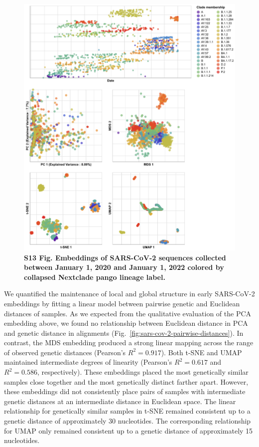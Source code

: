 \documentclass[10pt,letterpaper]{article}
\begin{document}
\begin{figure}[!h]
\includegraphics[width=\columnwidth]{figures/sarscov2-embeddings-by-Nextclade_pango_collapsed-clade.png}
\caption*{{\bf S13 Fig. Embeddings of SARS-CoV-2 sequences collected between January 1, 2020 and January 1, 2022 colored by collapsed Nextclade pango lineage label.}}
\end{figure}

We quantified the maintenance of local and global structure in early SARS-CoV-2 embeddings by fitting a linear model between pairwise genetic and Euclidean distances of samples.
As we expected from the qualitative evaluation of the PCA embedding above, we found no relationship between Euclidean distance in PCA and genetic distance in alignments (Fig.~\ref{fig:sars-cov-2-pairwise-distances}).
In contrast, the MDS embedding produced a strong linear mapping across the range of observed genetic distances (Pearson's $R^{2}=0.917$).
Both t-SNE and UMAP maintained intermediate degrees of linearity (Pearson's $R^{2}=0.617$ and $R^{2}=0.586$, respectively).
These embeddings placed the most genetically similar samples close together and the most genetically distinct farther apart.
However, these embeddings did not consistently place pairs of samples with intermediate genetic distances at an intermediate distance in Euclidean space.
The linear relationship for genetically similar samples in t-SNE remained consistent up to a genetic distance of approximately 30 nucleotides.
The corresponding relationship for UMAP only remained consistent up to a genetic distance of approximately 15 nucleotides.
\end{document}
